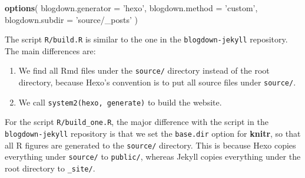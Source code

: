\documentclass[12pt,]{krantz}
\makeatletter
\newenvironment{Shaded}{\begin{snugshade}}{\end{snugshade}}
\newcommand{\DataTypeTok}[1]{\textcolor[rgb]{0.13,0.29,0.53}{#1}}
\newcommand{\KeywordTok}[1]{\textcolor[rgb]{0.13,0.29,0.53}{\textbf{#1}}}
\newcommand{\NormalTok}[1]{#1}
\newcommand{\StringTok}[1]{\textcolor[rgb]{0.31,0.60,0.02}{#1}}
\newenvironment{kframe}{%
\medskip{}
\setlength{\fboxsep}{.8em}
 \def\at@end@of@kframe{}%
 \ifinner\ifhmode%
  \def\at@end@of@kframe{\end{minipage}}%
  \begin{minipage}{\columnwidth}%
 \fi\fi%
 \def\FrameCommand##1{\hskip\@totalleftmargin \hskip-\fboxsep
 \colorbox{shadecolor}{##1}\hskip-\fboxsep
     \hskip-\linewidth \hskip-\@totalleftmargin \hskip\columnwidth}%
 \MakeFramed {\advance\hsize-\width
   \@totalleftmargin\z@ \linewidth\hsize
   \@setminipage}}%
 {\par\unskip\endMakeFramed%
 \at@end@of@kframe}
\renewenvironment{Shaded}{\begin{kframe}}{\end{kframe}}
\theoremstyle{definition}
\theoremstyle{definition}
\theoremstyle{definition}
\theoremstyle{remark}
\makeatother
\begin{document}
\begin{Shaded}
\begin{Highlighting}[]
\KeywordTok{options}\NormalTok{(}
  \DataTypeTok{blogdown.generator =} \StringTok{'hexo'}\NormalTok{,}
  \DataTypeTok{blogdown.method =} \StringTok{'custom'}\NormalTok{,}
  \DataTypeTok{blogdown.subdir =} \StringTok{'source/_posts'}
\NormalTok{)}
\end{Highlighting}
\end{Shaded}

The script \texttt{R/build.R} is similar to the one in the
\texttt{blogdown-jekyll} repository. The main differences are:

\begin{enumerate}
\def\labelenumi{\arabic{enumi}.}
\item
  We find all Rmd files under the \texttt{source/} directory instead of
  the root directory, because Hexo's convention is to put all source
  files under \texttt{source/}.
\item
  We call
  \texttt{system2(\textquotesingle{}hexo\textquotesingle{},\ \textquotesingle{}generate\textquotesingle{})}
  to build the website.
\end{enumerate}

For the script \texttt{R/build\_one.R}, the major difference with the
script in the \texttt{blogdown-jekyll} repository is that we set the
\texttt{base.dir} option for \textbf{knitr}, so that all R figures are
generated to the \texttt{source/} directory. This is because Hexo copies
everything under \texttt{source/} to \texttt{public/}, whereas Jekyll
copies everything under the root directory to \texttt{\_site/}.
\end{document}
